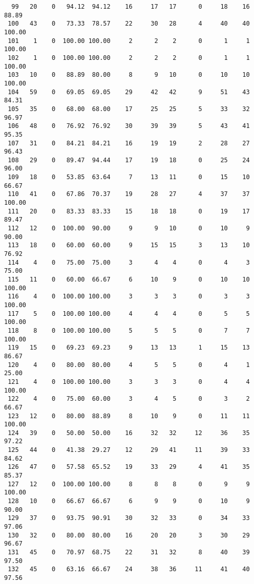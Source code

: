 \begin{verbatim}
  99   20    0   94.12  94.12    16     17   17      0     18    16    88.89
 100   43    0   73.33  78.57    22     30   28      4     40    40   100.00
 101    1    0  100.00 100.00     2      2    2      0      1     1   100.00
 102    1    0  100.00 100.00     2      2    2      0      1     1   100.00
 103   10    0   88.89  80.00     8      9   10      0     10    10   100.00
 104   59    0   69.05  69.05    29     42   42      9     51    43    84.31
 105   35    0   68.00  68.00    17     25   25      5     33    32    96.97
 106   48    0   76.92  76.92    30     39   39      5     43    41    95.35
 107   31    0   84.21  84.21    16     19   19      2     28    27    96.43
 108   29    0   89.47  94.44    17     19   18      0     25    24    96.00
 109   18    0   53.85  63.64     7     13   11      0     15    10    66.67
 110   41    0   67.86  70.37    19     28   27      4     37    37   100.00
 111   20    0   83.33  83.33    15     18   18      0     19    17    89.47
 112   12    0  100.00  90.00     9      9   10      0     10     9    90.00
 113   18    0   60.00  60.00     9     15   15      3     13    10    76.92
 114    4    0   75.00  75.00     3      4    4      0      4     3    75.00
 115   11    0   60.00  66.67     6     10    9      0     10    10   100.00
 116    4    0  100.00 100.00     3      3    3      0      3     3   100.00
 117    5    0  100.00 100.00     4      4    4      0      5     5   100.00
 118    8    0  100.00 100.00     5      5    5      0      7     7   100.00
 119   15    0   69.23  69.23     9     13   13      1     15    13    86.67
 120    4    0   80.00  80.00     4      5    5      0      4     1    25.00
 121    4    0  100.00 100.00     3      3    3      0      4     4   100.00
 122    4    0   75.00  60.00     3      4    5      0      3     2    66.67
 123   12    0   80.00  88.89     8     10    9      0     11    11   100.00
 124   39    0   50.00  50.00    16     32   32     12     36    35    97.22
 125   44    0   41.38  29.27    12     29   41     11     39    33    84.62
 126   47    0   57.58  65.52    19     33   29      4     41    35    85.37
 127   12    0  100.00 100.00     8      8    8      0      9     9   100.00
 128   10    0   66.67  66.67     6      9    9      0     10     9    90.00
 129   37    0   93.75  90.91    30     32   33      0     34    33    97.06
 130   32    0   80.00  80.00    16     20   20      3     30    29    96.67
 131   45    0   70.97  68.75    22     31   32      8     40    39    97.50
 132   45    0   63.16  66.67    24     38   36     11     41    40    97.56

\end{verbatim}
